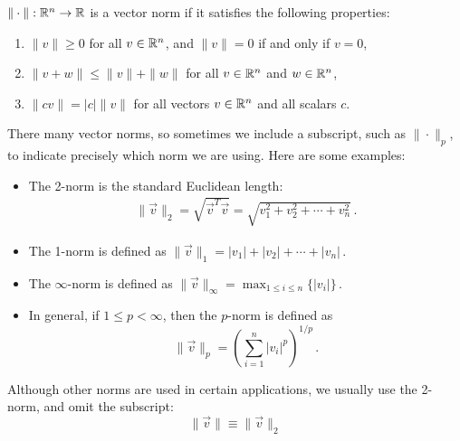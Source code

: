 \documentclass[pdf,9pt]{beamer}
\begin{document}
\begin{frame}
\begin{definition}
    $\|\cdot\| : \mathbb{R}^n \rightarrow \mathbb{R}$ is a \alert{vector norm} if it satisfies the following properties:
    \begin{enumerate}
	\item $\| v \| \geq 0$ for all $v \in \mathbb{R}^n$, and $\| v \| = 0$ if and only if $v = 0$,
	\item $\| v + w \| \leq \|v\| + \|w\|$ for all $v\in\mathbb{R}^n$ and $w \in \mathbb{R}^n$,
	\item $\| cv\| = |c| \|v\|$ for all vectors $v\in\mathbb{R}^n$ and all scalars $c$.
    \end{enumerate}
\end{definition}


\end{frame}
\begin{frame}[fragile]
\begin{remark}
There many vector norms, so
sometimes we include a subscript, such as $\| \cdot \|_p$, to indicate precisely
which norm we are using.  Here are some examples:
\begin{itemize}
    \item The \alert{2-norm} is the standard Euclidean length:
    \begin{align*}
      \| \vec{v} \|_2 = \sqrt{\vec{v}^T\vec{v}} = \sqrt{v_1^2 + v_2^2 + \cdots + v_n^2}\,.
    \end{align*}
    \item The \alert{1-norm} is defined as \quad
    $
      \|\vec{v}\|_1 = |v_1| + |v_2| + \cdots + |v_n|\,.
    $\\[0.5em]
    \item The \alert{$\infty$-norm} is defined as \quad
    $
      \|\vec{v}\|_{\infty} = \max_{1\leq i\leq n} \{ |v_i| \}\,.
      $\\[0.5em]
    \item In general, if $1 \leq p < \infty$, then the \alert{$p$-norm} is defined as
    $$
      \|\vec{v}\|_p = \left(\sum_{i=1}^n |v_i|^p\right)^{1/p}\,.
    $$
\end{itemize}
Although other norms are used in certain applications, we usually use the 2-norm,
and omit the subscript:
$$
  \|\vec{v} \| \equiv \|\vec{v}\|_2
$$
\end{remark}
\end{frame}
\end{document}
